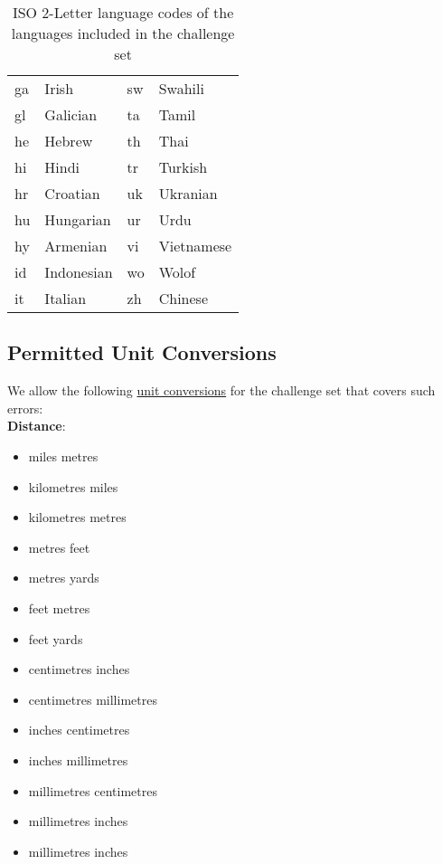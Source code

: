 \documentclass[11pt]{article}
\begin{document}
\begin{table}[ht]
\begin{tabular}{ll|ll}
ga   & Irish                                                    & sw   & Swahili    \\
gl   & Galician                                                 & ta   & Tamil      \\
he   & Hebrew                                                   & th   & Thai       \\
hi   & Hindi                                                    & tr   & Turkish    \\
hr   & Croatian                                                 & uk   & Ukranian   \\
hu   & Hungarian                                                & ur   & Urdu       \\
hy   & Armenian                                                 & vi   & Vietnamese \\
id   & Indonesian                                               & wo   & Wolof      \\
it   & Italian                                                  & zh   & Chinese    \\ \hline      
\end{tabular}
\caption{ISO 2-Letter language codes of the languages included in the challenge set}
\label{lang_codes}
\end{table} 
\subsection{Permitted Unit Conversions}
\label{app:allowed-units}

We allow the following \hyperref[subsec:units]{unit conversions} for the challenge set that covers such errors:\\

\noindent \textbf{Distance}:
\begin{itemize}
    \setlength\itemsep{0.05em}
    \item miles  metres
    \item kilometres  miles
    \item kilometres  metres
    \item metres  feet
    \item metres  yards
    \item feet  metres
    \item feet  yards
    \item centimetres  inches
    \item centimetres  millimetres
    \item inches  centimetres
    \item inches  millimetres
    \item millimetres  centimetres
    \item millimetres  inches
    \item millimetres  inches
\end{itemize}
\end{document}
